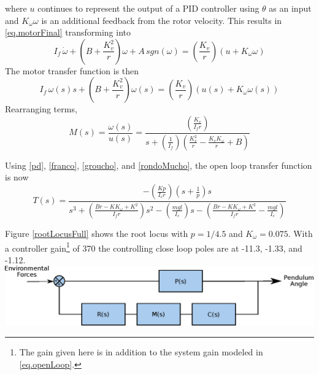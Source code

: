 \documentclass[12pt,letterpaper]{article}
\begin{document}
where $u$ continues to represent the output of a PID controller using $\theta$ as an input and $K_{\omega}\omega$ is an additional feedback
from the rotor velocity.
%
This results in \eqref{eq.motorFinal} transforming into
\begin{equation}
    I_{f} \, \dot{\omega} + \left( B+\frac{K_{v}^2}{r} \right) \omega +A \, sgn(\omega)= \left(\frac{K_{v}} {r}\right)(u + K_{\omega}\omega)
\end{equation}
The motor transfer function is then
\begin{equation}
    I_{f} \, \omega(s) s + \left( B+\frac{K_{v}^2}{r} \right) \omega(s) = \left(\frac{K_{v}} {r}\right)(u(s)+K_{\omega} \omega(s))
\end{equation}
Rearranging terms,
\begin{equation}
    M(s) = \frac{\omega(s)}{u(s)} =  \frac{\left(\frac{K_{v}} {I_{f}r}\right)}{s + (\frac{1}{I_{f}})(\frac{K_{v}^2}{r}-\frac{K_{v} K_{\omega}}{r}+B)}
    \label{rondoMucho}
\end{equation} 

Using \eqref{pd}, \eqref{franco}, \eqref{groucho}, and \eqref{rondoMucho}, the open loop transfer function is now
\begin{equation}
	T(s) =\frac{-(\frac{Kp} {I_{c}r})(s+\frac{1}{p})s}
	{s^3 + (\frac{B r-K K_{\omega}+K^2}{I_{f}r})s^2 - (\frac{m g l}{I_{c}})s - (\frac{Br-K K_{\omega}+K^2}{I_{f}r} - \frac{m g l}{I_{c}})}\label{eq.openLoop}
\end{equation}

Figure \ref{rootLocusFull} shows the root locus with $p = 1/4.5$ and $K_{\omega} = 0.075$.  With a controller gain\footnote{The gain given here is in addition to the system gain modeled in \eqref{eq.openLoop}. } of 370 the controlling close loop poles are at -11.3, -1.33, and -1.12.\\

\includegraphics[width=\textwidth]{images/transferFunction.eps}
    \label{transferFunction}
\end{document}
